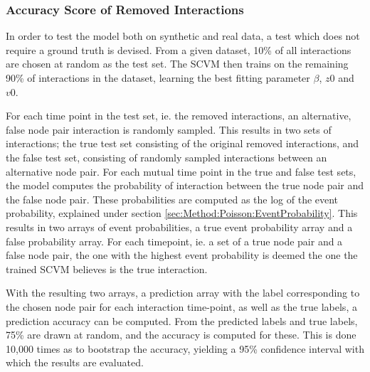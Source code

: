 \subsubsection{Accuracy Score of Removed Interactions}
\label{sec:Method:Evaluation:AUC}
In order to test the model both on synthetic and real data, a test which does not require a ground truth is devised.
From a given dataset, 10\% of all interactions are chosen at random as the test set.
The SCVM then trains on the remaining 90\% of interactions in the dataset, learning the best fitting parameter $\beta$, $z0$ and $v0$.

For each time point in the test set, ie. the removed interactions, an alternative, false node pair interaction is randomly sampled.
This results in two sets of interactions; the true test set consisting of the original removed interactions, and the false test set, consisting of randomly sampled interactions between an alternative node pair.
For each mutual time point in the true and false test sets, the model computes the probability of interaction between the true node pair and the false node pair.
These probabilities are computed as the log of the event probability, explained under section \ref{sec:Method:Poisson:EventProbability}.
This results in two arrays of event probabilities, a true event probability array and a false probability array.
For each timepoint, ie. a set of a true node pair and a false node pair, the one with the highest event probability is deemed the one the trained SCVM believes is the true interaction.

With the resulting two arrays, a prediction array with the label corresponding to the chosen node pair for each interaction time-point, as well as the true labels, a prediction accuracy can be computed.
From the predicted labels and true labels, 75\% are drawn at random, and the accuracy is computed for these.
This is done 10,000 times as to bootstrap the accuracy, yielding a 95\% confidence interval with which the results are evaluated.



